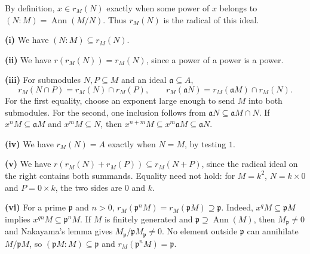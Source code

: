 By definition, $x\in r_M(N)$ exactly when some power of $x$ belongs to $(N:M)=\operatorname{Ann}(M/N)$. Thus $r_M(N)$ is the radical of this ideal.

\textbf{(i)} We have $(N:M)\subseteq r_M(N)$.

\textbf{(ii)} We have $r(r_M(N))=r_M(N)$, since a power of a power is a power.

\textbf{(iii)} For submodules $N,P\subseteq M$ and an ideal $\mathfrak{a}\subseteq A$,
\[r_M(N\cap P)=r_M(N)\cap r_M(P),\qquad r_M(\mathfrak{a}N)=r_M(\mathfrak{a}M)\cap r_M(N).\]
For the first equality, choose an exponent large enough to send $M$ into both submodules. For the second, one inclusion follows from $\mathfrak{a}N\subseteq\mathfrak{a}M\cap N$. If $x^nM\subseteq\mathfrak{a}M$ and $x^mM\subseteq N$, then $x^{n+m}M\subseteq x^m\mathfrak{a}M\subseteq\mathfrak{a}N$.

\textbf{(iv)} We have $r_M(N)=A$ exactly when $N=M$, by testing $1$.

\textbf{(v)} We have $r(r_M(N)+r_M(P))\subseteq r_M(N+P)$, since the radical ideal on the right contains both summands. Equality need not hold: for $M=k^2$, $N=k\times0$ and $P=0\times k$, the two sides are $0$ and $k$.

\textbf{(vi)} For a prime $\mathfrak{p}$ and $n>0$, $r_M(\mathfrak{p}^nM)=r_M(\mathfrak{p}M)\supseteq\mathfrak{p}$. Indeed, $x^qM\subseteq\mathfrak{p}M$ implies $x^{qn}M\subseteq\mathfrak{p}^nM$. If $M$ is finitely generated and $\mathfrak{p}\supseteq\operatorname{Ann}(M)$, then $M_{\mathfrak{p}}\ne0$ and Nakayama's lemma gives $M_{\mathfrak{p}}/\mathfrak{p}M_{\mathfrak{p}}\ne0$. No element outside $\mathfrak{p}$ can annihilate $M/\mathfrak{p}M$, so $(\mathfrak{p}M:M)\subseteq\mathfrak{p}$ and $r_M(\mathfrak{p}^nM)=\mathfrak{p}$.
